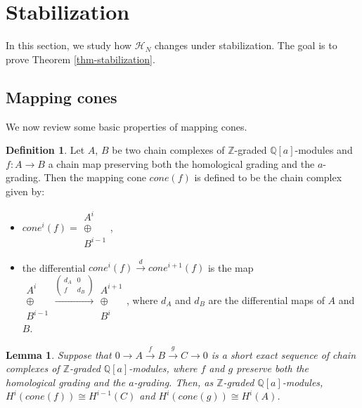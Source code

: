 \documentclass{amsart}
\theoremstyle{plain}
\newtheorem{lemma}[theorem]{Lemma}
\theoremstyle{definition}
\newtheorem{definition}[theorem]{Definition}
\theoremstyle{remark}
\numberwithin{equation}{section}
\begin{document}
\section{Stabilization}\label{sec-stabilization}

In this section, we study how ${\mathcal{H}}_N$ changes under stabilization. The goal is to prove Theorem \ref{thm-stabilization}.

\subsection{Mapping cones} We now review some basic properties of mapping cones.

\begin{definition}\label{def-mapping-cone}
Let $A$, $B$ be two chain complexes of ${\mathbb{Z}}$-graded ${\mathbb{Q}}[a]$-modules and $f:A \rightarrow B$ a chain map preserving both the homological grading and the $a$-grading. Then the mapping cone $cone(f)$ is defined to be the chain complex given by:
\begin{itemize}
	\item $cone^i(f) = \left.\begin{array}{c}
  A^i \\
  \oplus \\
  B^{i-1}
\end{array}\right.$,
\item the differential $cone^i(f) \xrightarrow{d} cone^{i+1}(f)$ is the map
$\left.\begin{array}{c}
  A^i \\
  \oplus \\
  B^{i-1}
\end{array}\right.
\xrightarrow{\left(\begin{array}{cc}
  d_A & 0 \\
  f & d_B
\end{array}\right)}
\left.\begin{array}{c}
  A^{i+1} \\
  \oplus \\
  B^{i}
\end{array}\right.$, where $d_A$ and $d_B$ are the differential maps of $A$ and $B$.
\end{itemize}
\end{definition}

\begin{lemma}\label{lemma-cone-1}
Suppose that $0 \rightarrow A \xrightarrow{f} B \xrightarrow{g} C \rightarrow 0$ is a short exact sequence of chain complexes of ${\mathbb{Z}}$-graded ${\mathbb{Q}}[a]$-modules, where $f$ and $g$ preserve both the homological grading and the $a$-grading. Then, as ${\mathbb{Z}}$-graded ${\mathbb{Q}}[a]$-modules, $H^i(cone(f)) \cong H^{i-1}(C)$ and $H^i(cone(g)) \cong H^i(A)$.
\end{lemma}
\end{document}
